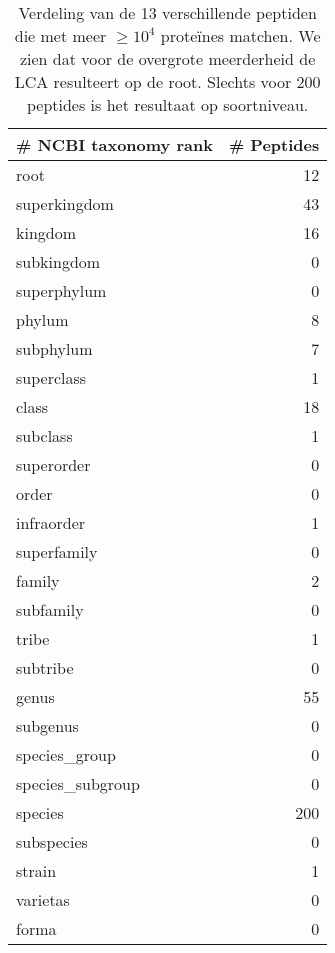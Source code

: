 \begin{table}[h!]
    \centering
    \begin{tabular}{|l|r|}
        \hline
        \textbf{\# NCBI taxonomy rank} & \textbf{\# Peptides} \\ \hline
        root & 12\thinspace369 \\ \hline
        superkingdom & 43 \\ \hline
        kingdom & 16 \\ \hline
        subkingdom & 0 \\ \hline
        superphylum & 0 \\ \hline
        phylum & 8 \\ \hline
        subphylum & 7 \\ \hline
        superclass & 1 \\ \hline
        class & 18 \\ \hline
        subclass & 1 \\ \hline
        superorder & 0 \\ \hline
        order & 0 \\ \hline
        infraorder & 1 \\ \hline
        superfamily & 0 \\ \hline
        family & 2 \\ \hline
        subfamily & 0 \\ \hline
        tribe & 1 \\ \hline
        subtribe & 0 \\ \hline
        genus & 55 \\ \hline
        subgenus & 0 \\ \hline
        species\_group & 0 \\ \hline
        species\_subgroup & 0 \\ \hline
        species & 200 \\ \hline
        subspecies & 0 \\ \hline
        strain & 1 \\ \hline
        varietas & 0 \\ \hline
        forma & 0 \\ \hline
    \end{tabular}
    \caption{Verdeling van de 13 verschillende peptiden die met meer $\geq 10^4$ proteïnes matchen. We zien dat voor de overgrote meerderheid de LCA resulteert op de root. Slechts voor 200 peptides is het resultaat op soortniveau.}
    \label{tab:peptides_distribution}
\end{table}


